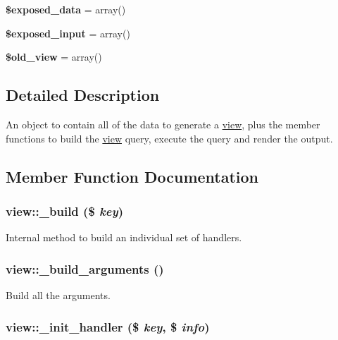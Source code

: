 \begin{CompactItemize}
\item 
\hypertarget{classview_2f755435e8eabb4b0c019f37232a443f}{
\textbf{\$exposed\_\-data} = array()}
\label{classview_2f755435e8eabb4b0c019f37232a443f}

\item 
\hypertarget{classview_a40f1ce888992360d84a44f072eb8ef6}{
\textbf{\$exposed\_\-input} = array()}
\label{classview_a40f1ce888992360d84a44f072eb8ef6}

\item 
\hypertarget{classview_8031538e237d25f6075834eabe94d5a7}{
\textbf{\$old\_\-view} = array()}
\label{classview_8031538e237d25f6075834eabe94d5a7}

\end{CompactItemize}


\subsection{Detailed Description}
An object to contain all of the data to generate a \hyperlink{classview}{view}, plus the member functions to build the \hyperlink{classview}{view} query, execute the query and render the output. 

\subsection{Member Function Documentation}
\hypertarget{classview_85b835ebd83d4e84bf4fbda3829ce12b}{
\subsubsection[{\_\-build}]{\setlength{\rightskip}{0pt plus 5cm}view::\_\-build (\$ {\em key})}}
\label{classview_85b835ebd83d4e84bf4fbda3829ce12b}


Internal method to build an individual set of handlers. \hypertarget{classview_aca007d4c1a81235098314c3b54e9277}{
\subsubsection[{\_\-build\_\-arguments}]{\setlength{\rightskip}{0pt plus 5cm}view::\_\-build\_\-arguments ()}}
\label{classview_aca007d4c1a81235098314c3b54e9277}


Build all the arguments. \hypertarget{classview_c63256fe2666c60445bc14aaf7a6e885}{
\subsubsection[{\_\-init\_\-handler}]{\setlength{\rightskip}{0pt plus 5cm}view::\_\-init\_\-handler (\$ {\em key}, \/  \$ {\em info})}}
\label{classview_c63256fe2666c60445bc14aaf7a6e885}


